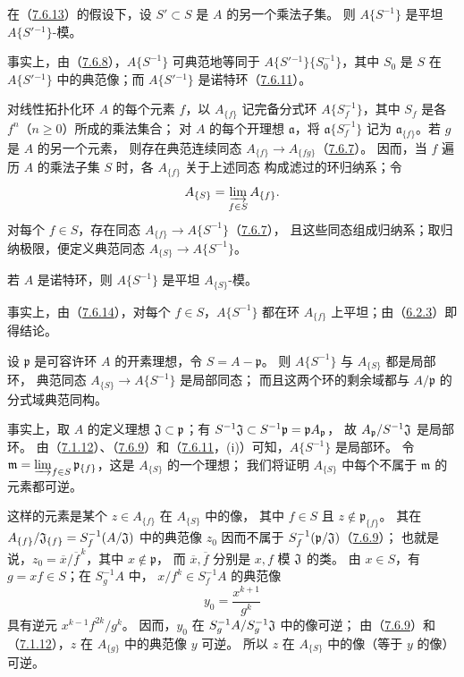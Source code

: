 在（\hyperlink{para:0:7.6.13}{7.6.13}）的假设下，设 $S'\subset S$ 是 $A$ 的另一个乘法子集。
则 $A\{S^{-1}\}$ 是平坦 $A\{S'{}^{-1}\}$-模。

事实上，由（\hyperlink{para:0:7.6.8}{7.6.8}），$A\{S^{-1}\}$ 可典范地等同于
$A\{S'{}^{-1}\}\{S_0^{-1}\}$，其中 $S_0$ 是 $S$ 在
$A\{S'{}^{-1}\}$ 中的典范像；而 $A\{S'{}^{-1}\}$ 是诺特环（\hyperlink{para:0:7.6.11}{7.6.11}）。

对线性拓扑化环 $A$ 的每个元素 $f$，以 $A_{\{f\}}$ 记完备分式环
$A\{S_f^{-1}\}$，其中 $S_f$ 是各 $f^n$（$n\geq0$）所成的乘法集合；
对 $A$ 的每个开理想 $\mathfrak a$，将 $\mathfrak a\{S_f^{-1}\}$ 记为
$\mathfrak a_{\{f\}}$。若 $g$ 是 $A$ 的另一个元素，
则存在典范连续同态 $A_{\{f\}}\to A_{\{fg\}}$（\hyperlink{para:0:7.6.7}{7.6.7}）。
因而，当 $f$ 遍历 $A$ 的乘法子集 $S$ 时，各 $A_{\{f\}}$ 关于上述同态
构成滤过的环归纳系；令
\[
 A_{\{S\}}=\varinjlim_{f\in S}A_{\{f\}}.
\]
对每个 $f\in S$，存在同态 $A_{\{f\}}\to A\{S^{-1}\}$（\hyperlink{para:0:7.6.7}{7.6.7}），
且这些同态组成归纳系；取归纳极限，便定义典范同态
$A_{\{S\}}\to A\{S^{-1}\}$。

若 $A$ 是诺特环，则 $A\{S^{-1}\}$ 是平坦 $A_{\{S\}}$-模。

事实上，由（\hyperlink{para:0:7.6.14}{7.6.14}），对每个 $f\in S$，$A\{S^{-1}\}$ 都在环
$A_{\{f\}}$ 上平坦；由（\hyperlink{para:0:6.2.3}{6.2.3}）即得结论。

设 $\mathfrak p$ 是可容许环 $A$ 的开素理想，令 $S=A-\mathfrak p$。
则 $A\{S^{-1}\}$ 与 $A_{\{S\}}$ 都是局部环，
典范同态 $A_{\{S\}}\to A\{S^{-1}\}$ 是局部同态；
而且这两个环的剩余域都与 $A/\mathfrak p$ 的分式域典范同构。

事实上，取 $A$ 的定义理想 $\mathfrak J\subset\mathfrak p$；有
$S^{-1}\mathfrak J\subset S^{-1}\mathfrak p=\mathfrak pA_{\mathfrak p}$，
故 $A_{\mathfrak p}/S^{-1}\mathfrak J$ 是局部环。
由（\hyperlink{para:0:7.1.12}{7.1.12}）、（\hyperlink{para:0:7.6.9}{7.6.9}）和（\hyperlink{para:0:7.6.11}{7.6.11}，(i)）可知，$A\{S^{-1}\}$ 是局部环。
令 $\mathfrak m=\varinjlim_{f\in S}\mathfrak p_{\{f\}}$，这是 $A_{\{S\}}$ 的一个理想；
我们将证明 $A_{\{S\}}$ 中每个不属于 $\mathfrak m$ 的元素都可逆。

这样的元素是某个 $z\in A_{\{f\}}$ 在 $A_{\{S\}}$ 中的像，
其中 $f\in S$ 且 $z\notin\mathfrak p_{\{f\}}$。
其在
$A_{\{f\}}/\mathfrak J_{\{f\}}=S_f^{-1}(A/\mathfrak J)$ 中的典范像 $z_0$
因而不属于 $S_f^{-1}(\mathfrak p/\mathfrak J)$（\hyperlink{para:0:7.6.9}{7.6.9}）；
也就是说，$z_0=\overline x/\overline f^{\,k}$，其中 $x\notin\mathfrak p$，
而 $\overline x,\overline f$ 分别是 $x,f$ 模 $\mathfrak J$ 的类。
由 $x\in S$，有 $g=xf\in S$；在 $S_g^{-1}A$ 中，
$x/f^k\in S_f^{-1}A$ 的典范像
\[
 y_0=\frac{x^{k+1}}{g^k}
\]
具有逆元 $x^{k-1}f^{2k}/g^k$。
因而，$y_0$ 在 $S_g^{-1}A/S_g^{-1}\mathfrak J$ 中的像可逆；
由（\hyperlink{para:0:7.6.9}{7.6.9}）和（\hyperlink{para:0:7.1.12}{7.1.12}），$z$ 在 $A_{\{g\}}$ 中的典范像 $y$ 可逆。
所以 $z$ 在 $A_{\{S\}}$ 中的像（等于 $y$ 的像）可逆。

